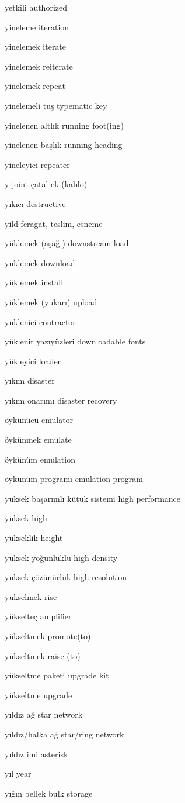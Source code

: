 \documentclass[12pt,fleqn]{article}\usepackage{../../common}
\begin{document}
yetkili authorized

yineleme iteration

yinelemek iterate

yinelemek reiterate

yinelemek repeat

yinelemeli tuş typematic key

yinelenen altlık running foot(ing)

yinelenen başlık running heading

yineleyici repeater

y-joint çatal ek (kablo)

yıkıcı destructive

yild feragat, teslim, esneme 

yüklemek (aşağı) downstream load

yüklemek download

yüklemek install

yüklemek (yukarı) upload

yüklenici contractor

yüklenir yazıyüzleri downloadable fonts

yükleyici loader

yıkım disaster

yıkım onarımı disaster recovery

öykünücü emulator

öykünmek emulate

öykünüm emulation

öykünüm programı emulation program

yüksek başarımlı kütük sistemi high performance

yüksek high

yükseklik height

yüksek yoğunluklu high density

yüksek çözünürlük high resolution

yükselmek rise

yükselteç amplifier

yükseltmek promote(to)

yükseltmek raise (to)

yükseltme paketi upgrade kit

yükseltme upgrade

yıldız ağ star network

yıldız/halka ağ star/ring network

yıldız imi asterisk

yıl year

yığın bellek bulk storage
\end{document}
